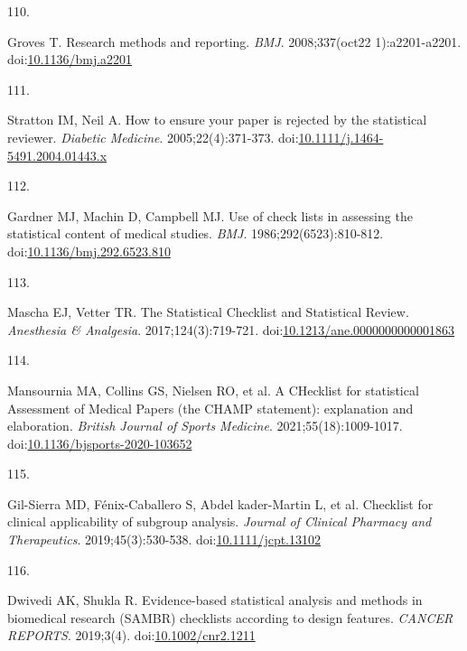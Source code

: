 \documentclass[
]{book}
\newlength{\cslhangindent}
\newlength{\csllabelwidth}
\newlength{\cslentryspacingunit} %
\newenvironment{CSLReferences}[2] %
 {%
  \setlength{\parindent}{0pt}
  \ifodd #1
  \let\oldpar\par
  \def\par{\hangindent=\cslhangindent\oldpar}
  \fi
  \setlength{\parskip}{#2\cslentryspacingunit}
 }%
 {}
\newcommand{\CSLLeftMargin}[1]{\parbox[t]{\csllabelwidth}{#1}}
\newcommand{\CSLRightInline}[1]{\parbox[t]{\linewidth - \csllabelwidth}{#1}\break}
\begin{document}
\begin{CSLReferences}{0}{0}
\leavevmode{}%
\CSLLeftMargin{110. }%
\CSLRightInline{Groves T. Research methods and reporting. \emph{BMJ}. 2008;337(oct22 1):a2201-a2201. doi:\href{https://doi.org/10.1136/bmj.a2201}{10.1136/bmj.a2201}}

\leavevmode{}%
\CSLLeftMargin{111. }%
\CSLRightInline{Stratton IM, Neil A. How to ensure your paper is rejected by the statistical reviewer. \emph{Diabetic Medicine}. 2005;22(4):371-373. doi:\href{https://doi.org/10.1111/j.1464-5491.2004.01443.x}{10.1111/j.1464-5491.2004.01443.x}}

\leavevmode{}%
\CSLLeftMargin{112. }%
\CSLRightInline{Gardner MJ, Machin D, Campbell MJ. Use of check lists in assessing the statistical content of medical studies. \emph{BMJ}. 1986;292(6523):810-812. doi:\href{https://doi.org/10.1136/bmj.292.6523.810}{10.1136/bmj.292.6523.810}}

\leavevmode{}%
\CSLLeftMargin{113. }%
\CSLRightInline{Mascha EJ, Vetter TR. The Statistical Checklist and Statistical Review. \emph{Anesthesia \& Analgesia}. 2017;124(3):719-721. doi:\href{https://doi.org/10.1213/ane.0000000000001863}{10.1213/ane.0000000000001863}}

\leavevmode{}%
\CSLLeftMargin{114. }%
\CSLRightInline{Mansournia MA, Collins GS, Nielsen RO, et al. A CHecklist for statistical Assessment of Medical Papers (the CHAMP statement): explanation and elaboration. \emph{British Journal of Sports Medicine}. 2021;55(18):1009-1017. doi:\href{https://doi.org/10.1136/bjsports-2020-103652}{10.1136/bjsports-2020-103652}}

\leavevmode{}%
\CSLLeftMargin{115. }%
\CSLRightInline{Gil-Sierra MD, Fénix-Caballero S, Abdel kader-Martin L, et al. Checklist for clinical applicability of subgroup analysis. \emph{Journal of Clinical Pharmacy and Therapeutics}. 2019;45(3):530-538. doi:\href{https://doi.org/10.1111/jcpt.13102}{10.1111/jcpt.13102}}

\leavevmode{}%
\CSLLeftMargin{116. }%
\CSLRightInline{Dwivedi AK, Shukla R. Evidence{-}based statistical analysis and methods in biomedical research (SAMBR) checklists according to design features. \emph{CANCER REPORTS}. 2019;3(4). doi:\href{https://doi.org/10.1002/cnr2.1211}{10.1002/cnr2.1211}}

\end{CSLReferences}
\end{document}
